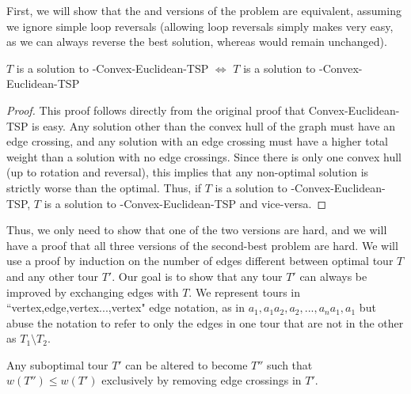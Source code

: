 First, we will show that the \exob{} and \inob{} versions of the problem are equivalent, assuming we ignore simple loop reversals (allowing loop reversals simply makes \inob{} very easy, as we can always reverse the best solution, whereas \exob{} would remain unchanged). 
\begin{lemma*}
        $T$ is a solution to \inob{}-Convex-Euclidean-TSP $\iff$ $T$ is a solution to \exob{}-Convex-Euclidean-TSP
\end{lemma*}
\begin{proof}
    This proof follows directly from the original proof that Convex-Euclidean-TSP is easy. Any solution other than the convex hull of the graph must have an edge crossing, and any solution with an edge crossing must have a higher total weight than a solution with no edge crossings. Since there is only one convex hull (up to rotation and reversal), this implies that any non-optimal solution is strictly worse than the optimal. Thus, if $T$ is a solution to \inob{}-Convex-Euclidean-TSP, $T$ is a solution to \exob{}-Convex-Euclidean-TSP and vice-versa.
\end{proof}
Thus, we only need to show that one of the two versions are hard, and we will have a proof that all three versions of the second-best problem are hard. We will use a proof by induction on the number of edges different between optimal tour $T$ and any other tour $T'$. Our goal is to show that any tour $T'$ can always be improved by exchanging edges with $T$. We represent tours in ``vertex,edge,vertex...,vertex" edge notation, as in $a_1,a_1a_2,a_2,...,a_na_1,a_1$ but abuse the notation to refer to only the edges in one tour that are not in the other as $T_1 \setminus T_2$.

\begin{theorem}
    Any suboptimal tour $T'$ can be altered to become $T''$ such that $w(T'') \leq w(T')$ exclusively by removing edge crossings in $T'$.
\end{theorem}

